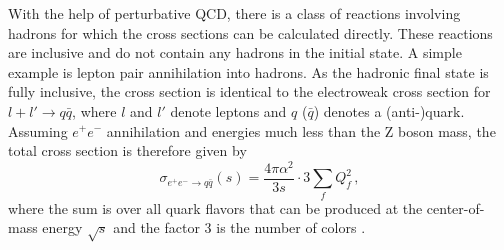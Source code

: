 With the help of perturbative QCD, there is a class of reactions involving hadrons for which the cross sections can be calculated directly.
These reactions are inclusive and do not contain any hadrons in the initial state.
A simple example is lepton pair annihilation into hadrons.
As the hadronic final state is fully inclusive, the cross section is identical to the electroweak cross section for $l+l' \rightarrow q \bar q$, where $l$ and $l'$ denote leptons and $q$ ($\bar q$) denotes a (anti-)quark.
Assuming $e^+ e^-$ annihilation and energies much less than the Z boson mass, the total cross section is therefore given by
%
\begin{equation}
  \sigma_{e^+ e^- \rightarrow q \bar q}(s) = \frac{4 \pi \alpha^2}{3 s} \cdot 3 \sum_f Q_f^2 \, ,
	\label{eq:e+e-_annihilation}
\end{equation}
%
where the sum is over all quark flavors that can be produced at the center-of-mass energy $\sqrt s$ and the factor $3$ is the number of colors \cite{cteq2001}.
%

